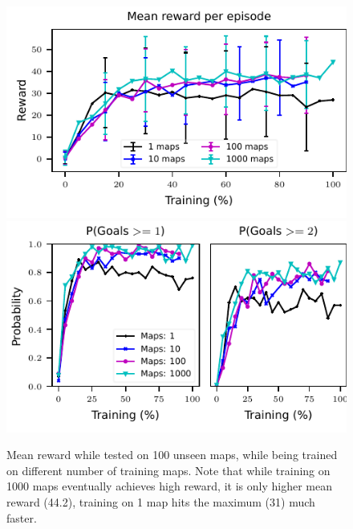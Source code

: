 \begin{figure}%
 \vspace{-3em}%
\includegraphics[width=0.5\columnwidth]{images/plot_reward_3D-1000.pdf}%
\includegraphics[width=0.5\columnwidth]{images/plot_probability_3D-1000.pdf}%
\vspace{-1em}%
\caption{Mean reward while tested on 100 unseen maps, while being trained on different number of training maps. Note that while training on 1000 maps eventually achieves high reward, it is only higher mean reward (44.2), training on 1 map hits the maximum (31) much faster.}%
\label{fig:plot_reward_on_testing}%
\end{figure}
